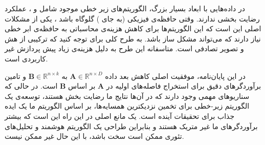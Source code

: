 در داده‌هایی با ابعاد بسیار بزرگ، الگوریتم‌های زیر خطی موجود شامل 
و 
، عملکرد رضایت بخشی ندارند.  وقتی حافظه‌ی فیزیکی (به جای 
) گلوگاه باشد%
، یکی از مشکلات اصلی این است که این الگوریتم‌ها برای کاهش هزینه‌ی محاسباتی به حافظه‌ی ابر خطی%
 نیاز دارند که می‌تواند مشکل ساز باشد.
\cite{litez100}
به طرح کلی برای 
توجه کنید که ترکیبی از هش%
و تصویر تصادفی است. متاسفانه این طرح به دلیل هزینه‌ی زیاد پیش پردازش غیر کاربردی است.
\cite{litez100}

در این پایان‌نامه، موفقیت اصلی کاهش بعد داده 
$\mathbf{A} \in \mathbb{R}^{n \times D}$
به
$\mathbf{B} \in \mathbb{R}^{n \times k}$
و تامین برآوردگرهای دقیق برای استخراج فاصله‌های اولیه در 
$\mathbf{A}$
بر اساس
$\mathbf{B}$
است. در حالی که سناریوهای مهمی وجود دارند که در آن‌ها نتایج ما رضایت بخش هستند، توسعه‌ی یک الگوریتم زیر-خطی برای تخمین نزدیکترین همسایه‌ها، بر اساس الگوریتم ما یک ایده جذاب برای تحقیقات آینده است. یک مانع اصلی در این راه این است که  بیشتر برآوردگرهای ما غیر متریک هستند و بنابراین طراحی یک الگوریتم هوشمند و تحلیل‌های تئوری ممکن است سخت باشد، با این حال غیر ممکن نیست.





